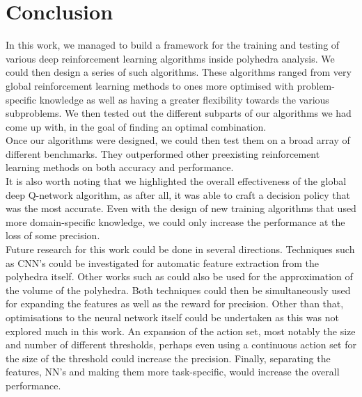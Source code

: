 \chapter{Conclusion}
In this work, we managed to build a framework for the training and testing of various deep reinforcement learning algorithms inside polyhedra analysis. We could then design a series of such algorithms. These algorithms ranged from very global reinforcement learning methods to ones more optimised with problem-specific knowledge as well as having a greater flexibility towards the various subproblems. We then tested out the different subparts of our algorithms we had come up with, in the goal of finding an optimal combination.\\
Once our algorithms were designed, we could then test them on a broad array of different benchmarks. They outperformed other preexisting reinforcement learning methods on both accuracy and performance.\\
It is also worth noting that we highlighted the overall effectiveness of the global deep Q-network algorithm, as after all, it was able to craft a decision policy that was the most accurate. Even with the design of new training algorithms that used more domain-specific knowledge, we could only increase the performance at the loss of some precision.\\
Future research for this work could be done in several directions. Techniques such as CNN's could be investigated for automatic feature extraction from the polyhedra itself. Other works such as \cite{dyer1991random, kim2004fast} could also be used for the approximation of the volume of the polyhedra. Both techniques could then be simultaneously used for expanding the features as well as the reward for precision. Other than that, optimisations to the neural network itself could be undertaken as this was not explored much in this work. An expansion of the action set, most notably the size and number of different thresholds, perhaps even using a continuous action set for the size of the threshold could increase the precision. Finally, separating the features, NN's and making them more task-specific, would increase the overall performance.  
